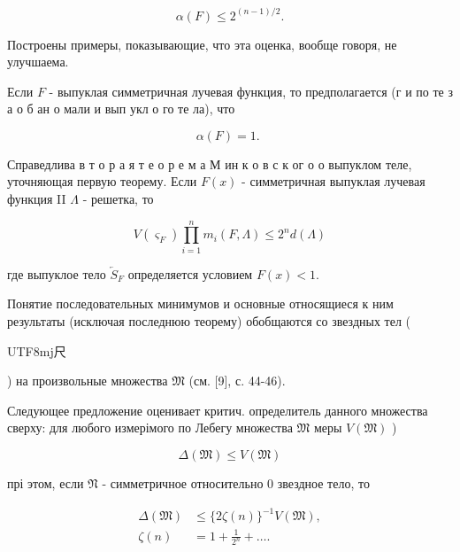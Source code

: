 \documentclass[10pt]{article}
\begin{document}
\[

\alpha(F) \leqslant 2^{(n-1) / 2} .

\]



Построены примеры, показывающие, что эта оценка, вообще говоря, не улучшаема.



Если $F$ - выпуклая симметричная лучевая функция, то предполагается (г и по те з а о б ан о мали и вып укл о го те ла), что



\[

\alpha(F)=1 \text {. }

\]



Справедлива в т о р а я т е о р е м а М ин к о в с к ог о о выпуклом теле, уточняющая первую теорему. Если $F(x)$ - симметричная выпуклая лучевая функция II $\Lambda$ - решетка, то



\[

V\left(\varsigma_{F}\right) \prod_{i=1}^{n} m_{i}(F, \Lambda) \leqslant 2^{n} d(\Lambda)

\]



где выпуклое тело $\overleftarrow{S}_{F}$ определяется условием $F(x)<1$.



Понятие последовательных минимумов и основные относящиеся к ним результаты (исключая последнюю теорему) обобщаются со звездных тел (\begin{CJK}{UTF8}{mj}尺\end{CJK}) на произвольные множества $\mathfrak{M}$ (см. [9], с. 44-46).



Следующее предложение оценивает критич. определитель данного множества сверху: для любого измерімого по Лебегу множества $\mathfrak{M}$ меры $V(\mathfrak{M})$ )



\[

\Delta(\mathfrak{M}) \leqslant V(\mathfrak{M})

\]



прі этом, если $\mathfrak{N}$ - симметричное относительно 0 звездное тело, то



\[

\begin{aligned}

\Delta(\mathfrak{M}) & \leqslant\{2 \zeta(n)\}^{-1} V(\mathfrak{M}), \\

\zeta(n) & =1+\frac{1}{2^{n}}+\ldots .

\end{aligned}

\]
\end{document}

